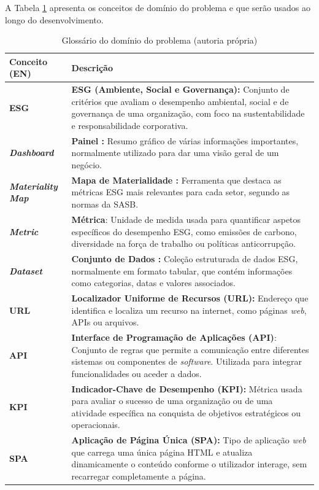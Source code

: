 A Tabela \ref{tab:glossario_dominio} apresenta os conceitos de domínio do problema e que serão usados ao longo do desenvolvimento.

\begin{table}[H]
\centering
\begin{tabular}{|>{\bfseries}p{3cm}|p{11cm}|}
        \hline
    \textbf{Conceito (EN)} & \textbf{Descrição} \\
        \hline
    ESG & \textbf{ESG (Ambiente, Social e Governança):} Conjunto de critérios que avaliam o desempenho ambiental, social e de governança de uma organização, com foco na sustentabilidade e responsabilidade corporativa. \\
        \hline
    \textit{Dashboard} & \textbf{Painel :} Resumo gráfico de várias informações importantes, normalmente utilizado para dar uma visão geral de um negócio. \\
        \hline
    \textit{Materiality Map} & \textbf{Mapa de Materialidade :} Ferramenta que destaca as métricas ESG mais relevantes para cada setor, segundo as normas da SASB. \\
        \hline
    \textit{Metric} & \textbf{Métrica}: Unidade de medida usada para quantificar aspetos específicos do desempenho ESG, como emissões de carbono, diversidade na força de trabalho ou políticas anticorrupção. \\
        \hline
    \textit{Dataset} & \textbf{Conjunto de Dados :} Coleção estruturada de dados ESG, normalmente em formato tabular, que contém informações como categorias, datas e valores associados. \\
        \hline
    URL & \textbf{Localizador Uniforme de Recursos (URL):} Endereço que identifica e localiza um recurso na internet, como páginas \textit{web}, APIs ou arquivos. \\
    API & \textbf{Interface de Programação de Aplicações (API)}: Conjunto de regras que permite a comunicação entre diferentes sistemas ou componentes de \textit{software}. Utilizada para integrar funcionalidades ou aceder a dados. \\
        \hline
    KPI & \textbf{Indicador-Chave de Desempenho (KPI):} Métrica usada para avaliar o sucesso de uma organização ou de uma atividade específica na conquista de objetivos estratégicos ou operacionais. \\
        \hline
    SPA & \textbf{Aplicação de Página Única (SPA):} Tipo de aplicação \textit{web} que carrega uma única página HTML e atualiza dinamicamente o conteúdo conforme o utilizador interage, sem recarregar completamente a página. \\
        \hline
\end{tabular}
\caption{Glossário do domínio do problema (autoria própria)}
\label{tab:glossario_dominio}
\end{table}

